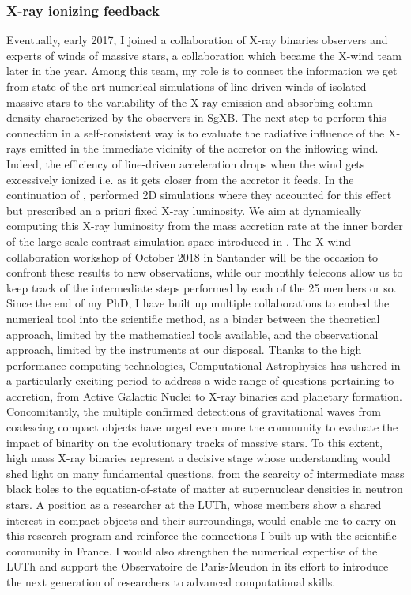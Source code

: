 \documentclass[a4paper,12pt,onecolumn]{article}
\makeatletter
\newcommand{\sgx}{SgXB\xspace}
\newcommand*{\ie}{i.e.\@\xspace}
\makeatother
\begin{document}
\subsubsection*{X-ray ionizing feedback}

Eventually, early 2017, I joined a collaboration of X-ray binaries observers and experts of winds of massive stars, a collaboration which became the X-wind team later in the year. Among this team, my role is to connect the information we get from state-of-the-art numerical simulations of line-driven winds of isolated massive stars \citep{Sundqvist2017,Sander2017} to the variability of the X-ray emission and absorbing column density characterized by the observers in \sgx \citep{Grinberg2017}. The next step to perform this connection in a self-consistent way is to evaluate the radiative influence of the X-rays emitted in the immediate vicinity of the accretor on the inflowing wind. Indeed, the efficiency of line-driven acceleration drops when the wind gets excessively ionized \ie as it gets closer from the accretor it feeds. In the continuation of \cite{Blondin1990}, \cite{Manousakis2015c} performed 2D simulations where they accounted for this effect but prescribed an a priori fixed X-ray luminosity. We aim at dynamically computing this X-ray luminosity from the mass accretion rate at the inner border of the large scale contrast simulation space introduced in \cite{ElMellah}. The X-wind collaboration workshop of October 2018 in Santander will be the occasion to confront these results to new observations, while our monthly telecons allow us to keep track of the intermediate steps performed by each of the 25 members or so.\\

Since the end of my PhD, I have built up multiple collaborations to embed the numerical tool into the scientific method, as a binder between the theoretical approach, limited by the mathematical tools available, and the observational approach, limited by the instruments at our disposal. Thanks to the high performance computing technologies, Computational Astrophysics has ushered in a particularly exciting period to address a wide range of questions pertaining to accretion, from Active Galactic Nuclei to X-ray binaries and planetary formation. Concomitantly, the multiple confirmed detections of gravitational waves from coalescing compact objects have urged even more the community to evaluate the impact of binarity on the evolutionary tracks of massive stars. To this extent, high mass X-ray binaries represent a decisive stage whose understanding would shed light on many fundamental questions, from the scarcity of intermediate mass black holes to the equation-of-state of matter at supernuclear densities in neutron stars. A position as a researcher at the LUTh, whose members show a shared interest in compact objects and their surroundings, would enable me to carry on this research program and reinforce the connections I built up with the scientific community in France. I would also strengthen the numerical expertise of the LUTh and support the Observatoire de Paris-Meudon in its effort to introduce the next generation of researchers to advanced computational skills.\\
\end{document}
